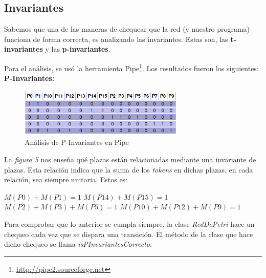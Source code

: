 \documentclass{article}
\newcommand{\fnpipe}{\url{http://pipe2.sourceforge.net}}
\begin{document}
    \subsection{Invariantes}
    Sabemos que una de las maneras de chequear que la red (y nuestro programa) funciona 
    de forma correcta, es analizando las invariantes. Estas son, las \textbf{t-invariantes}
    y las \textbf{p-invariantes}. \par
    Para el análisis, se usó la herramienta Pipe\footnote{\fnpipe}.
    Los resultados fueron los siguientes: \newline \newline
    \textbf{P-Invariantes:} \\
    \begin{figure}[H]
        \includegraphics[width=0.7\textwidth, center]{p-invariante.png}
        \caption{Análisis de P-Invariantes en Pipe}
    \end{figure}
    La \emph{figura 5} nos enseña qué plazas están relacionadas mediante una invariante de
    plazas. Esta relación indica que la suma de los \emph{tokens} en dichas plazas, en cada
    relación, sea siempre unitaria. Estos es: \newline \newline
    \begin{center}
        $M(P0) + M(P1) = 1$ \newline \newline
        $M(P14) + M(P15) = 1$ \newline \newline
        $M(P2) + M(P3) + M(P5) = 1$ \newline \newline
        $M(P10) + M(P12) + M(P9) = 1$ \newline \newline
    \end{center} \par
    Para comprobar que lo anterior se cumpla siempre, la clase \emph{RedDePetri} hace un 
    chequeo cada vez que se dispara una transición. El método de la clase que hace dicho
    chequeo se llama \emph{isPInvariantesCorrecto}. \newline \newline
\end{document}
